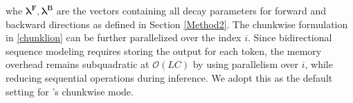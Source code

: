 whe $\mathbf{\lambda^F}, \mathbf{\lambda^B}$ are the vectors containing all decay parameters for forward and backward directions as defined in Section \ref{Method2}.  The chunkwise formulation in \cref{chunklion} can be further parallelized over the index \(i\). Since bidirectional sequence modeling requires storing the output for each token, the memory overhead remains subquadratic at \(\mathcal{O}(LC)\) by using parallelism over $i$, while reducing sequential operations during inference. We adopt this as the default setting for \lion's chunkwise mode.








